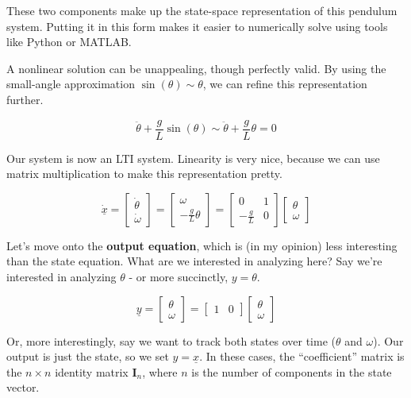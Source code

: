 \documentclass[
  letterpaper,
  DIV=11,
  numbers=noendperiod]{scrreprt}
\begin{document}
These two components make up the state-space representation of this
pendulum system. Putting it in this form makes it easier to numerically
solve using tools like Python or MATLAB.

A nonlinear solution can be unappealing, though perfectly valid. By
using the small-angle approximation \(\sin(\theta) \sim \theta\), we can
refine this representation further.

\[\ddot{\theta} + \frac{g}{L} \sin(\theta) \sim \ddot{\theta} + \frac{g}{L} \theta = 0\]

Our system is now an LTI system. Linearity is very nice, because we can
use matrix multiplication to make this representation pretty.

\[\dot{\underline{x}} = \begin{bmatrix}
    \dot{\theta} \\
    \dot{\omega}  \end{bmatrix} = \begin{bmatrix}
    \omega \\
    -\frac{g}{L} \theta
\end{bmatrix} = \begin{bmatrix}
    0 & 1\\
    -\frac{g}{L} & 0
\end{bmatrix} \begin{bmatrix}
    \theta \\
    \omega  \end{bmatrix}\]

Let's move onto the \textbf{output equation}, which is (in my opinion)
less interesting than the state equation. What are we interested in
analyzing here? Say we're interested in analyzing \(\theta\) - or more
succinctly, \(y = \theta\).

\[\underline{y} = \begin{bmatrix}
    \theta \\
    \omega  \end{bmatrix} = \begin{bmatrix}
        1 & 0
    \end{bmatrix} \begin{bmatrix}
        \theta \\
        \omega  \end{bmatrix}\]

Or, more interestingly, say we want to track both states over time
(\(\theta\) and \(\omega\)). Our output is just the state, so we set
\(y=\underline{x}\). In these cases, the ``coefficient'' matrix is the
\(n\times n\) identity matrix \(\textbf{I}_n\), where \(n\) is the
number of components in the state vector.
\end{document}
